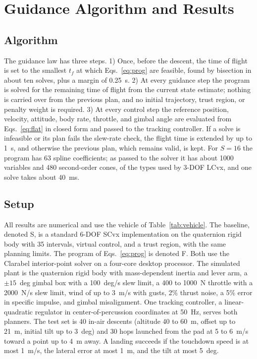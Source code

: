 \section{Guidance Algorithm and Results}\label{sec:results}
\subsection{Algorithm}\label{sec:algorithm}
The guidance law has three steps. 1) Once, before the descent, the time of flight is set to the smallest $t_f$ at which
Eqs.~\eqref{eq:prog} are feasible, found by bisection in about ten solves, plus a margin of 0.25~s. 2) At every guidance step
the program is solved for the remaining time of flight from the current state estimate; nothing is carried over from the
previous plan, and no initial trajectory, trust region, or penalty weight is required. 3) At every control step the reference
position, velocity, attitude, body rate, throttle, and gimbal angle are evaluated from Eqs.~\eqref{eq:flat} in closed form
and passed to the tracking controller. If a solve is infeasible or its plan fails the slew-rate check, the flight time is
extended by up to 1~s, and otherwise the previous plan, which remains valid, is kept. For $S=16$ the program has 63 spline
coefficients; as passed to the solver it has about 1000 variables and 480 second-order cones, of the types used by 3-DOF
LCvx, and one solve takes about 40~ms.

\subsection{Setup}
All results are numerical and use the vehicle of Table~\ref{tab:vehicle}. The baseline, denoted S, is a standard 6-DOF SCvx
implementation \cite{mao2016,szmuk2018} on the quaternion rigid body with 35 intervals, virtual control, and a trust region,
with the same planning limits. The program of Eqs.~\eqref{eq:prog} is denoted F. Both use the Clarabel interior-point solver
on a four-core desktop processor. The simulated plant is the quaternion rigid body with mass-dependent inertia and lever arm,
a $\pm15$~deg gimbal box with a 100~deg/s slew limit, a 400 to 1000~N throttle with a 2000~N/s slew limit, wind of up to
3~m/s with gusts, 2\% thrust noise, a 5\% error in specific impulse, and gimbal misalignment. One tracking controller, a
linear-quadratic regulator in center-of-percussion coordinates at 50~Hz, serves both planners. The test set is 40 in-air
descents (altitude 40 to 60~m, offset up to 21~m, initial tilt up to 3~deg) and 30 hops launched from the pad at 5 to 6~m/s
toward a point up to 4~m away. A landing succeeds if the touchdown speed is at most 1~m/s, the lateral error at most 1~m,
and the tilt at most 5~deg.

